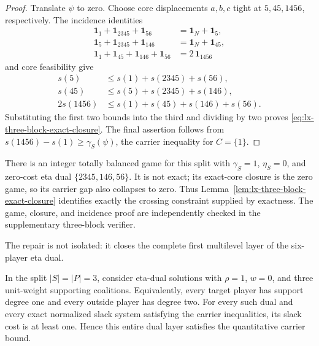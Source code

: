 \begin{proof}
Translate $\psi$ to zero.  Choose core displacements $a,b,c$ tight at
$5,45,1456$, respectively.  The incidence identities
\begin{align*}
 \mathbf1_1+\mathbf1_{2345}+\mathbf1_{56}
   &=\mathbf1_N+\mathbf1_5,\\
 \mathbf1_5+\mathbf1_{2345}+\mathbf1_{146}
   &=\mathbf1_N+\mathbf1_{45},\\
 \mathbf1_1+\mathbf1_{45}+\mathbf1_{146}+\mathbf1_{56}
   &=2\,\mathbf1_{1456}
\end{align*}
and core feasibility give
\begin{align*}
 s(5)&\leq s(1)+s(2345)+s(56),\\
 s(45)&\leq s(5)+s(2345)+s(146),\\
 2s(1456)&\leq s(1)+s(45)+s(146)+s(56).
\end{align*}
Substituting the first two bounds into the third and dividing by two proves
\eqref{eq:lx-three-block-exact-closure}.  The final assertion follows from
$s(1456)-s(1)\geq\gamma_S(\psi)$, the carrier inequality for $C=\{1\}$.
\end{proof}

There is an integer totally balanced game for this split with
$\gamma_S=1$, $\eta_S=0$, and zero-cost eta dual $\{2345,146,56\}$.
It is not exact; its exact-core closure is the zero game, so its carrier gap
also collapses to zero.  Thus Lemma~\ref{lem:lx-three-block-exact-closure}
identifies exactly the crossing constraint supplied by exactness.  The game,
closure, and incidence proof are independently checked in the supplementary
three-block verifier.

The repair is not isolated: it closes the complete first multilevel layer of
the six-player eta dual.

\begin{proposition}
\label{prop:lx-n6-unit-triple-layer}
In the split $|S|=|P|=3$, consider eta-dual solutions with $\rho=1$,
$w=0$, and three unit-weight supporting coalitions.  Equivalently, every
target player has support degree one and every outside player has degree two.
For every such dual and every exact normalized slack system satisfying the
carrier inequalities, its slack cost is at least one.  Hence this entire
dual layer satisfies the quantitative carrier bound.
\end{proposition}

